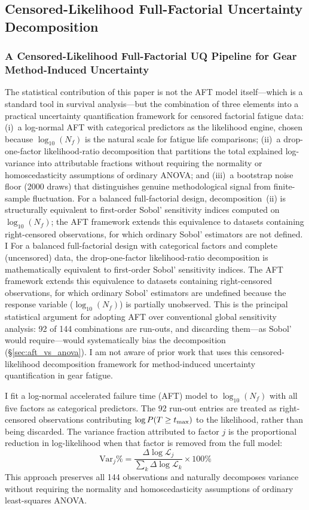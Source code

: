 \documentclass[12pt,a4paper]{article}
\begin{document}
\subsection{Censored-Likelihood Full-Factorial Uncertainty Decomposition}

\subsubsection{A Censored-Likelihood Full-Factorial UQ Pipeline for Gear Method-Induced Uncertainty}

The statistical contribution of this paper is not the AFT model
itself---which is a standard tool in survival analysis---but the
combination of three elements into a practical uncertainty
quantification framework for censored factorial fatigue data:
(i)~a log-normal AFT with categorical predictors as the likelihood
engine, chosen because $\log_{10}(N_f)$ is the natural scale for
fatigue life comparisons; (ii)~a drop-one-factor likelihood-ratio
decomposition that partitions the total explained log-variance into
attributable fractions without requiring the normality or
homoscedasticity assumptions of ordinary ANOVA; and (iii)~a bootstrap
noise floor (2000 draws) that distinguishes genuine methodological
signal from finite-sample fluctuation. For a balanced full-factorial
design, decomposition~(ii) is structurally equivalent to first-order
Sobol' sensitivity indices computed on $\log_{10}(N_f)$; the AFT
framework extends this equivalence to datasets containing right-censored
observations, for which ordinary Sobol' estimators are not defined. I
For a balanced full-factorial design with categorical factors and
complete (uncensored) data, the drop-one-factor likelihood-ratio
decomposition is mathematically equivalent to first-order Sobol'
sensitivity indices. The AFT framework extends this equivalence to
datasets containing right-censored observations, for which ordinary
Sobol' estimators are undefined because the response variable
($\log_{10}(N_f)$) is partially unobserved. This is the principal
statistical argument for adopting AFT over conventional global
sensitivity analysis: 92 of 144 combinations are run-outs, and
discarding them---as Sobol' would require---would systematically bias
the decomposition (\S\ref{sec:aft_vs_anova}). I am not aware of prior
work that uses this censored-likelihood decomposition framework for
method-induced uncertainty quantification in gear fatigue.

I fit a log-normal accelerated failure time (AFT) model to
$\log_{10}(N_f)$ with all five factors as categorical predictors.
The 92 run-out entries are treated as right-censored observations
contributing $\log P(T \geq t_{\rm max})$ to the likelihood, rather
than being discarded. The variance fraction attributed to factor
$j$ is the proportional reduction in log-likelihood when that factor
is removed from the full model:
\begin{equation}
\text{Var}_j\% =
\frac{\Delta\log\mathcal{L}_j}{\sum_k \Delta\log\mathcal{L}_k}
\times 100\%
\label{eq:lr_var}
\end{equation}
This approach
preserves all 144 observations and naturally decomposes variance
without requiring the normality and homoscedasticity assumptions of
ordinary least-squares ANOVA.
\end{document}
